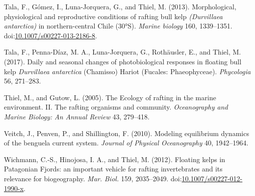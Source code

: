 \documentclass[
]{article}
\begin{document}
\leavevmode\hypertarget{ref-tala2013}{}%
Tala, F., Gómez, I., Luna-Jorquera, G., and Thiel, M. (2013).
Morphological, physiological and reproductive conditions of rafting bull
kelp \emph{(Durvillaea antarctica)} in northern-central Chile (30°S).
\emph{Marine biology} 160, 1339--1351.
doi:\href{https://doi.org/10.1007/s00227-013-2186-8}{10.1007/s00227-013-2186-8}.

\leavevmode\hypertarget{ref-tala2017}{}%
Tala, F., Penna-Díaz, M. A., Luna-Jorquera, G., Rothäusler, E., and
Thiel, M. (2017). Daily and seasonal changes of photobiological
responses in floating bull kelp \emph{Durvillaea antarctica} (Chamisso)
Hariot (Fucales: Phaeophyceae). \emph{Phycologia} 56, 271--283.

\leavevmode\hypertarget{ref-thiel2005}{}%
Thiel, M., and Gutow, L. (2005). The Ecology of rafting in the marine
environment. II. The rafting organisms and community. \emph{Oceanography
and Marine Biology: An Annual Review} 43, 279--418.

\leavevmode\hypertarget{ref-veitch2010}{}%
Veitch, J., Penven, P., and Shillington, F. (2010). Modeling equilibrium
dynamics of the benguela current system. \emph{Journal of Physical
Oceanography} 40, 1942--1964.

\leavevmode\hypertarget{ref-wichmann2012}{}%
Wichmann, C.-S., Hinojosa, I. A., and Thiel, M. (2012). Floating kelps
in Patagonian Fjords: an important vehicle for rafting invertebrates and
its relevance for biogeography. \emph{Mar. Biol.} 159, 2035--2049.
doi:\href{https://doi.org/10.1007/s00227-012-1990-x}{10.1007/s00227-012-1990-x}.
\end{document}
